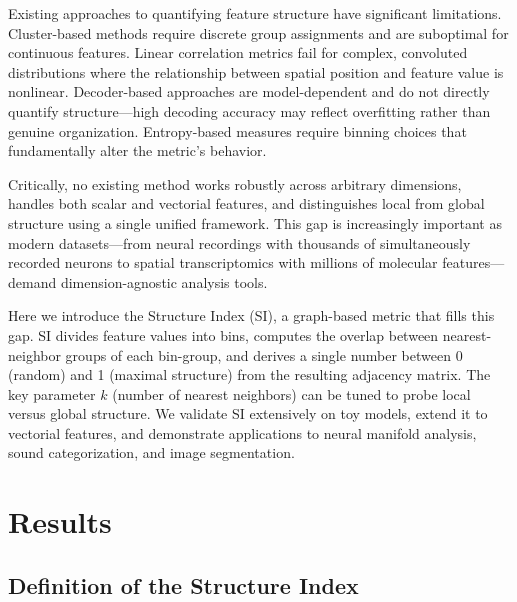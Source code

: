 \documentclass[11pt]{article}
\begin{document}
Existing approaches to quantifying feature structure have significant limitations. Cluster-based methods \citep{luxburg2007tutorial, chaudhuri2012spectral} require discrete group assignments and are suboptimal for continuous features. Linear correlation metrics \citep{moran1950spatial} fail for complex, convoluted distributions where the relationship between spatial position and feature value is nonlinear. Decoder-based approaches \citep{cunningham2014dimensionality} are model-dependent and do not directly quantify structure---high decoding accuracy may reflect overfitting rather than genuine organization. Entropy-based measures \citep{shannon1948mathematical} require binning choices that fundamentally alter the metric's behavior.

Critically, no existing method works robustly across arbitrary dimensions, handles both scalar and vectorial features, and distinguishes local from global structure using a single unified framework. This gap is increasingly important as modern datasets---from neural recordings with thousands of simultaneously recorded neurons \citep{jazayeri2021interpreting} to spatial transcriptomics with millions of molecular features---demand dimension-agnostic analysis tools.

Here we introduce the Structure Index (SI), a graph-based metric that fills this gap. SI divides feature values into bins, computes the overlap between nearest-neighbor groups of each bin-group, and derives a single number between 0 (random) and 1 (maximal structure) from the resulting adjacency matrix. The key parameter $k$ (number of nearest neighbors) can be tuned to probe local versus global structure. We validate SI extensively on toy models, extend it to vectorial features, and demonstrate applications to neural manifold analysis, sound categorization, and image segmentation.

\section{Results}

\subsection{Definition of the Structure Index}
\end{document}
